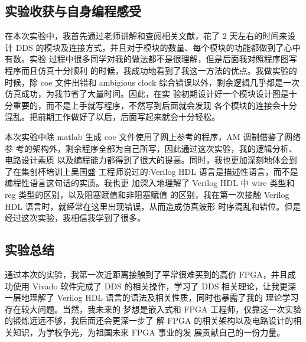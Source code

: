 {\begin{spacing}{1.5}
\subsection{实验收获与自身编程感受}
在本次实验中，我首先通过老师讲解和查阅相关文献，花了 2 天左右的时间来设计 DDS 的模块及连接方式，并且对于模块的数量、每个模块的功能都做到了心中有数。实验 过程中很多同学对我的做法都不是很理解，但是后面我对照程序图写程序而且仿真十分顺利 的时候，我成功地看到了我这一方法的优点。我做实验的时候，除 coe 文件出错和 ambigious clock 综合错误以外，剩余逻辑几乎都是一次仿真成功，为我节省了大量时间。因此，在实 验初期设计好一个模块设计图是十分重要的，而不是上手就写程序，不然写到后面就会发现 各个模块的连接会十分混乱。把前期工作做好了以后，后面写起来就会十分轻松。

本次实验中除 matlab 生成 coe 文件使用了网上参考的程序，AM 调制借鉴了网络参 考的架构外，剩余程序全部为自己所写，因此通过这次实验，我的逻辑分析、电路设计素质 以及编程能力都得到了很大的提高。同时，我也更加深刻地体会到了在集创杯培训上吴国盛 工程师说过的:Verilog HDL 语言是描述性语言，而不是编程性语言这句话的实质。我也更 加深入地理解了 Verilog HDL 中 wire 类型和 reg 类型的区别，以及阻塞赋值和非阻塞赋值 的区别，我在第一次接触 Verilog HDL 语言时，就经常在这里出现错误，从而造成仿真波形 时序混乱和错位。但是经过这次实验，我相信我学到了很多。

\subsection{实验总结}
通过本次的实验，我第一次近距离接触到了平常很难买到的高价 FPGA，并且成功使用 Vivado 软件完成了 DDS 的相关操作，学习了 DDS 相关理论，让我更深一层地理解了 Verilog HDL 语言的语法及相关性质，同时也暴露了我的 理论学习存在较大问题。当然，我未来的 梦想是嵌入式和 FPGA 工程师，仅靠这一次实验的锻炼远远不够，我后面还会更深一步了 解 FPGA 的相关架构以及电路设计的相关知识，为学校争光，为祖国未来 FPGA 事业的发 展贡献自己的一份力量。

\end{spacing}}
